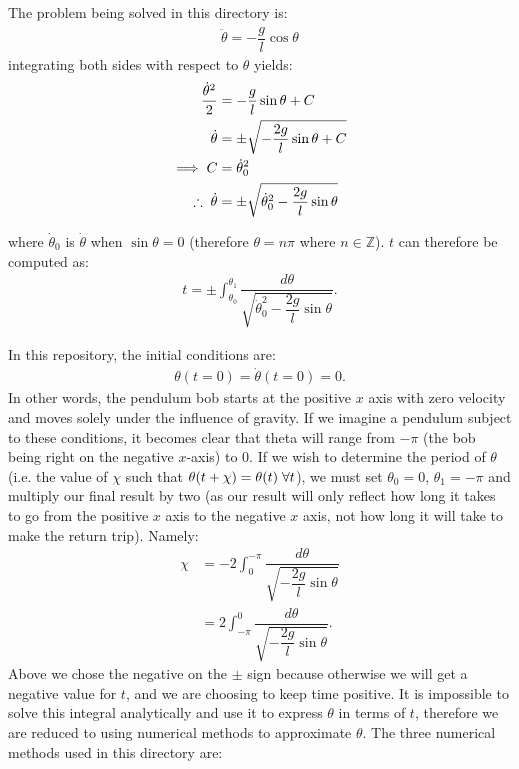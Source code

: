 \documentclass[12pt,a4paper,openright]{article}
\begin{document}
	The problem being solved in this directory is:
	\begin{align*}
	\ddot{\theta} = -\dfrac{g}{l} \cos{\theta}
	\end{align*}
	integrating both sides with respect to $\theta$ yields:
	\begin{align*}
		\dfrac{\dot{\theta}^2}{2} &= -\dfrac{g}{l} \sin{\theta} + C \\
		\dot{\theta} &= \pm \sqrt{-\dfrac{2g}{l} \sin{\theta} + C}\\
		\implies C &= \dot{\theta}_0^2 \\
		\therefore \hspace{0.1cm} \dot{\theta} &= \pm \sqrt{\dot{\theta}_0^2 - \dfrac{2g}{l} \sin{\theta}}
	\end{align*}

	where $\dot{\theta}_0$ is $\dot{\theta}$ when $\sin{\theta} = 0$ (therefore $\theta =n\pi$ where $n\in\mathbb{Z}$). $t$ can therefore be computed as:
	\begin{align*}
	t = \pm \int_{\theta_0}^{\theta_1} \dfrac{d\theta}{\sqrt{\dot{\theta}_0^2 - \dfrac{2g}{l} \sin{\theta}}}.
	\end{align*}

	In this repository, the initial conditions are:
	\begin{align*}
	\theta(t=0) = \dot{\theta}(t=0) = 0.
	\end{align*}
	In other words, the pendulum bob starts at the positive $x$ axis with zero velocity and moves solely under the influence of gravity. If we imagine a pendulum subject to these conditions, it becomes clear that theta will range from $-\pi$ (the bob being right on the negative $x$-axis) to $0$. If we wish to determine the period of $\theta$ (i.e. the value of $\chi$ such that $\theta(t+\chi) = \theta(t) \hspace{0.1cm}\forall t$), we must set $\theta_0=0$, $\theta_1 = -\pi$ and multiply our final result by two (as our result will only reflect how long it takes to go from the positive $x$ axis to the negative $x$ axis, not how long it will take to make the return trip). Namely:
	\begin{align*}
	\chi &= - 2\int_{0}^{-\pi} \dfrac{d\theta}{\sqrt{- \dfrac{2g}{l} \sin{\theta}}} \\
	  &= 2\int_{-\pi}^{0} \dfrac{d\theta}{\sqrt{- \dfrac{2g}{l} \sin{\theta}}}.
	\end{align*}
	Above we chose the negative on the $\pm$ sign because otherwise we will get a negative value for $t$, and we are choosing to keep time positive. It is impossible to solve this integral analytically and use it to express $\theta$ in terms of $t$, therefore we are reduced to using numerical methods to approximate $\theta$. The three numerical methods used in this directory are:
\end{document}
